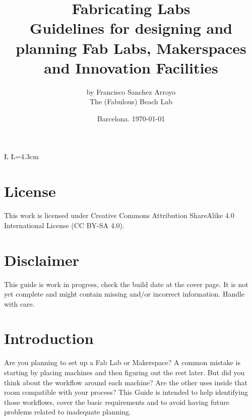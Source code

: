 \documentclass[a4paper,12pt,titlepage]{article}
\title{Fabricating Labs\\
\Huge \textbf{Guidelines for designing and planning Fab Labs, Makerspaces and Innovation Facilities}}
\author{
by Francisco Sanchez Arroyo\\
The (Fabulous) Beach Lab
}
\date{Barcelona. \today}
\begin{document}

\newcommand{\D}{6} %
\newcommand{\U}{5} %

\newdimen\R %
\R=3.5cm 
\newdimen\L %
\L=4.3cm


\newcommand{\A}{360/\D} %

\maketitle

\tableofcontents %
\clearpage






\pagestyle{fancy}

\section*{License}
This work is licensed under Creative Commons Attribution ShareAlike 4.0 International License (CC BY-SA 4.0). 

\section*{Disclaimer}
This guide is work in progress, check the build date at the cover page. It is not yet complete and might contain missing and/or incorrect information. Handle with care.

\section{Introduction}
Are you planning to set up a Fab Lab or Makerspace? A common mistake is starting by placing machines and then figuring out the rest later. But did you think about the workflow around each machine? Are the other uses inside that room compatible with your process?  This Guide is intended to help identifying those workflows, cover the basic requirements and to avoid having future problems related to inadequate planning.\\
\end{document}
